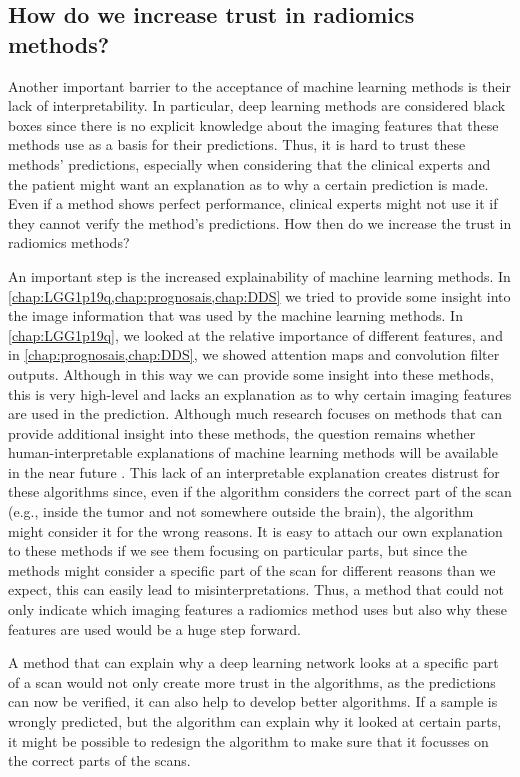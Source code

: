 \subsection{How do we increase trust in radiomics methods?}

Another important barrier to the acceptance of machine learning methods is their lack of interpretability.
In particular, deep learning methods are considered black boxes since there is no explicit knowledge about the imaging features that these methods use as a basis for their predictions.
Thus, it is hard to trust these methods' predictions, especially when considering that the clinical experts and the patient might want an explanation as to why a certain prediction is made.
Even if a method shows perfect performance, clinical experts might not use it if they cannot verify the method's predictions.
How then do we increase the trust in radiomics methods?

An important step is the increased explainability of machine learning methods.
In \cref{chap:LGG1p19q,chap:prognosais,chap:DDS} we  tried to provide some insight into the image information that was used by the machine learning methods.
In \cref{chap:LGG1p19q}, we looked at the relative importance of different features, and in \cref{chap:prognosais,chap:DDS}, we showed attention maps and convolution filter outputs.
Although in this way we can provide some insight into these methods, this is very high-level and lacks an explanation as to why certain imaging features are used in the prediction.
Although much research focuses on methods that can provide additional insight into these methods, the question remains whether human-interpretable explanations of machine learning methods will be available in the near future \autocite{zhang2018interpretable}.
This lack of an interpretable explanation creates distrust for these algorithms since, even if the algorithm considers the correct part of the scan (e.g., inside the \gls{tumor} and not somewhere outside the brain), the algorithm might consider it for the wrong reasons.
It is easy to attach our own explanation to these methods if we see them focusing on particular parts, but since the methods might consider a specific part of the scan for different reasons than we expect, this can easily lead to misinterpretations.
Thus, a method that could not only indicate which imaging features a radiomics method uses but also why these features are used would be a huge step forward.

A method that can explain why a deep learning network looks at a specific part of a scan would not only create more trust in the algorithms, as the predictions can now be verified, it can also help to develop better algorithms.
If a sample is wrongly predicted, but the algorithm can explain why it looked at certain parts, it might be possible to redesign the algorithm to make sure that it focusses on the correct parts of the scans.

